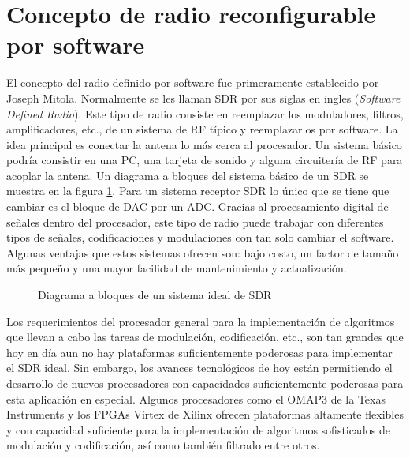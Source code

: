 \section{Concepto de radio reconfigurable por software}

El concepto del radio definido por software fue primeramente establecido por Joseph Mitola\citeyear{mitola}. Normalmente se les
llaman SDR por sus siglas en ingles (\emph{Software Defined Radio}). Este tipo de radio consiste en reemplazar los moduladores,
filtros, amplificadores, etc., de un sistema de RF t\'ipico y reemplazarlos por software. La idea principal es conectar la antena
lo m\'as cerca al procesador. Un sistema b\'asico podr\'ia consistir en una PC, una tarjeta de sonido y alguna circuiter\'ia de RF
para acoplar la antena. Un diagrama a bloques del sistema b\'asico de un SDR se muestra en la figura \ref{fig:sdr}. Para un
sistema receptor SDR lo \'unico que se tiene que cambiar es el bloque de DAC por un ADC. Gracias al procesamiento digital de
se\~nales dentro del procesador, este tipo de radio puede trabajar con diferentes tipos de se\~nales, codificaciones y
modulaciones con tan solo cambiar el software. Algunas ventajas que estos sistemas ofrecen son: bajo costo, un factor de tama\~no
m\'as peque\~no y una mayor facilidad de mantenimiento y actualizaci\'on.

\begin{figure}[tp]
\centering
	\vspace{0.3in}
	\caption{Diagrama a bloques de un sistema ideal de SDR}
	\label{fig:sdr}
\end{figure}

Los requerimientos del procesador general para la implementaci\'on de algoritmos que llevan a cabo las tareas de modulaci\'on,
codificaci\'on, etc., son tan grandes que hoy en d\'ia aun no hay plataformas suficientemente poderosas para implementar el SDR
ideal. Sin embargo, los avances tecnol\'ogicos de hoy est\'an permitiendo el desarrollo de nuevos procesadores con capacidades
suficientemente poderosas para esta aplicaci\'on en especial. Algunos procesadores como el OMAP3 de la Texas Instruments
\cite{ti} y los FPGAs Virtex de Xilinx \cite{lyrtech} ofrecen plataformas altamente flexibles y con capacidad suficiente para la
implementaci\'on de algoritmos sofisticados de modulaci\'on y codificaci\'on, as\'i como tambi\'en filtrado entre otros.

